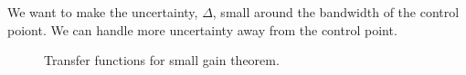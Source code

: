 We want to make the uncertainty, $\Delta$, small around the bandwidth of the control poiont. We can handle more uncertainty away from the control point.

\begin{figure}[ht!]
	\centering
	 \hfill
	\caption{Transfer functions for small gain theorem.}
	\label{fig:15sgt}
\end{figure}

